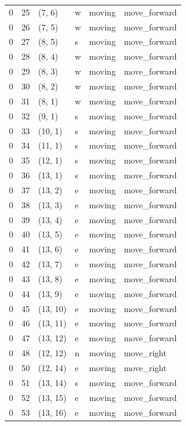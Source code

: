 \begin{table}[H]
\begin{tabular}{llllll}
    0 & 25 & (7, 6) & w & moving & move\_forward \\
    0 & 26 & (7, 5) & w & moving & move\_forward \\
    0 & 27 & (8, 5) & s & moving & move\_forward \\
    0 & 28 & (8, 4) & w & moving & move\_forward \\
    0 & 29 & (8, 3) & w & moving & move\_forward \\
    0 & 30 & (8, 2) & w & moving & move\_forward \\
    0 & 31 & (8, 1) & w & moving & move\_forward \\
    0 & 32 & (9, 1) & s & moving & move\_forward \\
    0 & 33 & (10, 1) & s & moving & move\_forward \\
    0 & 34 & (11, 1) & s & moving & move\_forward \\
    0 & 35 & (12, 1) & s & moving & move\_forward \\
    0 & 36 & (13, 1) & s & moving & move\_forward \\
    0 & 37 & (13, 2) & e & moving & move\_forward \\
    0 & 38 & (13, 3) & e & moving & move\_forward \\
    0 & 39 & (13, 4) & e & moving & move\_forward \\
    0 & 40 & (13, 5) & e & moving & move\_forward \\
    0 & 41 & (13, 6) & e & moving & move\_forward \\
    0 & 42 & (13, 7) & e & moving & move\_forward \\
    0 & 43 & (13, 8) & e & moving & move\_forward \\
    0 & 44 & (13, 9) & e & moving & move\_forward \\
    0 & 45 & (13, 10) & e & moving & move\_forward \\
    0 & 46 & (13, 11) & e & moving & move\_forward \\
    0 & 47 & (13, 12) & e & moving & move\_forward \\
    0 & 48 & (12, 12) & n & moving & move\_right \\
    0 & 50 & (12, 14) & e & moving & move\_right \\
    0 & 51 & (13, 14) & s & moving & move\_forward \\
    0 & 52 & (13, 15) & e & moving & move\_forward \\
    0 & 53 & (13, 16) & e & moving & move\_forward \\
    \bottomrule
  \end{tabular}
\end{table}


